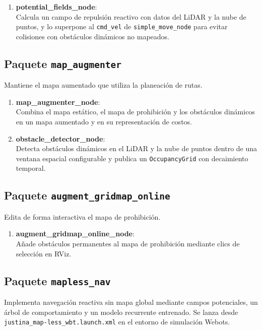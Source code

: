 \begin{enumerate}
    \item \textbf{potential\_fields\_node}: \\
    Calcula un campo de repulsión reactivo con datos del LiDAR y la nube de puntos, y lo superpone al \texttt{cmd\_vel} de \texttt{simple\_move\_node} para evitar colisiones con obstáculos dinámicos no mapeados.
\end{enumerate}

\subsection{Paquete \texttt{map\_augmenter}}
Mantiene el mapa aumentado que utiliza la planeación de rutas.

\begin{enumerate}
    \item \textbf{map\_augmenter\_node}: \\
    Combina el mapa estático, el mapa de prohibición y los obstáculos dinámicos en un mapa aumentado y en su representación de costos.

    \item \textbf{obstacle\_detector\_node}: \\
    Detecta obstáculos dinámicos en el LiDAR y la nube de puntos dentro de una ventana espacial configurable y publica un \texttt{OccupancyGrid} con decaimiento temporal.
\end{enumerate}

\subsection{Paquete \texttt{augment\_gridmap\_online}}
Edita de forma interactiva el mapa de prohibición.

\begin{enumerate}
    \item \textbf{augment\_gridmap\_online\_node}: \\
    Añade obstáculos permanentes al mapa de prohibición mediante clics de selección en RViz.
\end{enumerate}

\subsection{Paquete \texttt{mapless\_nav}}
Implementa navegación reactiva sin mapa global mediante campos potenciales, un árbol de comportamiento y un modelo recurrente entrenado. Se lanza desde \texttt{justina\_map-\allowbreak{}less\_wbt.launch.xml} en el entorno de simulación Webots.

